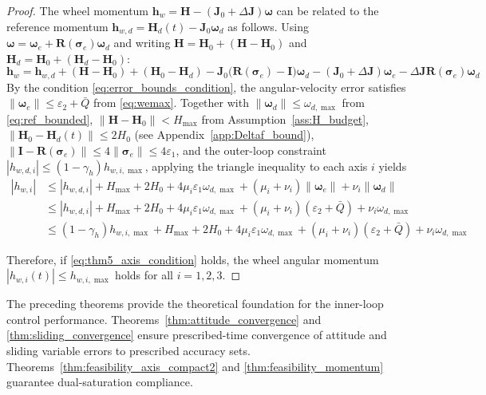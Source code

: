 \documentclass[journal]{new-aiaa}
\begin{document}
\begin{proof}
The wheel momentum $\boldsymbol{h}_w = \boldsymbol{H} - (\boldsymbol{J}_0+\Delta\boldsymbol{J})\boldsymbol{\omega}$ can be related to the reference momentum $\boldsymbol{h}_{w,d} = \boldsymbol{H}_d(t) - \boldsymbol{J}_0\boldsymbol{\omega}_d$ as follows.
Using $\boldsymbol{\omega} = \boldsymbol{\omega}_e + \boldsymbol{R}(\boldsymbol{\sigma}_e)\boldsymbol{\omega}_d$ and writing $\boldsymbol{H} = \boldsymbol{H}_0 + (\boldsymbol{H}-\boldsymbol{H}_0)$ and $\boldsymbol{H}_d = \boldsymbol{H}_0 + (\boldsymbol{H}_d-\boldsymbol{H}_0)$:
\[
\boldsymbol{h}_w = \boldsymbol{h}_{w,d} + (\boldsymbol{H} - \boldsymbol{H}_0) + (\boldsymbol{H}_0 - \boldsymbol{H}_d)
- \boldsymbol{J}_0\big(\boldsymbol{R}(\boldsymbol{\sigma}_e)-\boldsymbol{I}\big)\boldsymbol{\omega}_d
- (\boldsymbol{J}_0 + \Delta\boldsymbol{J})\boldsymbol{\omega}_e
- \Delta\boldsymbol{J}\boldsymbol{R}(\boldsymbol{\sigma}_e)\boldsymbol{\omega}_d
\]
By the condition \eqref{eq:error_bounds_condition}, the angular-velocity error satisfies $\|\boldsymbol{\omega}_e\| \le \varepsilon_2 + \bar Q$ from \eqref{eq:wemax}.
Together with $\|\boldsymbol{\omega}_d\| \le \omega_{d,\max}$ from \eqref{eq:ref_bounded}, 
$\|\boldsymbol{H} - \boldsymbol{H}_0\| < H_{\max}$ from Assumption~\ref{ass:H_budget},
$\|\boldsymbol{H}_0 - \boldsymbol{H}_d(t)\| \le 2H_0$ (see Appendix~\ref{app:Deltaf_bound}),
$\|\boldsymbol{I} - \boldsymbol{R}(\boldsymbol{\sigma}_e)\| \le 4\|\boldsymbol{\sigma}_e\| \le 4\varepsilon_1$,
and the outer-loop constraint $|h_{w,d,i}| \le (1 - \gamma_h) h_{w,i,\max}$, 
applying the triangle inequality to each axis $i$ yields
\begin{align}
  |h_{w,i}| &\le |h_{w,d,i}| + H_{\max} + 2H_0 + 4\mu_i\varepsilon_1\omega_{d,\max} + (\mu_i + \nu_i)\|\boldsymbol{\omega}_e\| + \nu_i\|\boldsymbol{\omega}_d\| \nonumber \\
  &\le |h_{w,d,i}| + H_{\max} + 2H_0 + 4\mu_i\varepsilon_1\omega_{d,\max} + (\mu_i + \nu_i) (\varepsilon_2 + \bar Q) + \nu_i \omega_{d,\max} \nonumber \\
  &\le (1 - \gamma_h) h_{w,i,\max} + H_{\max} + 2H_0 + 4\mu_i\varepsilon_1\omega_{d,\max} + (\mu_i + \nu_i) (\varepsilon_2 + \bar Q) + \nu_i \omega_{d,\max}
\end{align}

Therefore, if \eqref{eq:thm5_axis_condition} holds, the wheel angular momentum $|h_{w,i}(t)|\le h_{w,i,\max}$ holds for all $i=1,2,3$.
\end{proof}

The preceding theorems provide the theoretical foundation for the inner-loop control performance. 
Theorems~\ref{thm:attitude_convergence} and \ref{thm:sliding_convergence} ensure prescribed-time convergence of attitude and sliding variable errors to prescribed accuracy sets. 
Theorems~\ref{thm:feasibility_axis_compact2} and \ref{thm:feasibility_momentum} guarantee dual-saturation compliance.
\end{document}
